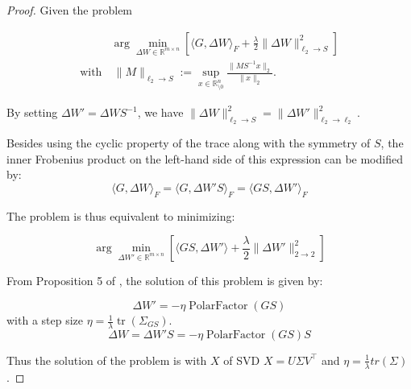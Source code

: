    \begin{proof}
    Given the problem 
    
        \begin{equation}
        \begin{aligned}
            & \arg \min_{\Delta W \in \mathbb{R}^{m \times n}} \left[  \langle G, \Delta W \rangle_F + \frac{\lambda}{2} \| \Delta W \|_{\ell_2 \rightarrow S}^2 \right] \\
             \text{with} & \ \| M \|_{\ell_2 \rightarrow S} := \sup_{x \in \mathbb{R}^{n}_{\setminus 0}} \frac{\| M S^{-1} x \|_2}{\| x\|_2}.
        \end{aligned}
        \end{equation}

    By setting $\Delta W' = \Delta W S^{-1}$, we have 
$\| \Delta W \|_{\ell_2 \rightarrow S}^2 = \| \Delta W' \|_{\ell_2 \rightarrow \ell_2}^2$.

Besides using the cyclic property of the trace along with the symmetry of $S$, the inner Frobenius product on the left-hand side of this expression can be modified by:
    \begin{equation}
    \label{eq:frobprod}
    \langle G, \Delta W  \rangle_F = \langle G, \Delta W' S  \rangle_F = \langle G S, \Delta W' \rangle_F
    \end{equation}

    The problem is thus equivalent to minimizing:
    
    \begin{equation}
        \arg \min_{\Delta W' \in \mathbb{R}^{m \times n}} \left[ \langle GS, \Delta W' \rangle + \frac{\lambda}{2} \| \Delta W'\|_{2 \rightarrow 2}^2 \right] 
    \end{equation}
    
    From Proposition 5 of \citet{bernstein2024oldoptimizernewnorm}, the solution of this problem is given by:
    
    
    \begin{equation}
       \Delta W' = - \eta \operatorname{PolarFactor}(GS)
    \end{equation}
    with a step size $\eta = \frac{1}{\lambda} \operatorname{tr}(\Sigma_{GS})$.
    \begin{equation}
       \Delta W = \Delta W' S= - \eta \operatorname{PolarFactor}(GS) S
    \end{equation}

\iffalse
Thus the solution of the problem is 
    \noindent with $X$ of SVD $X = U \Sigma V^\top$ and $\eta = \frac{1}{\lambda} tr (\Sigma)$.
    

\end{proof}
